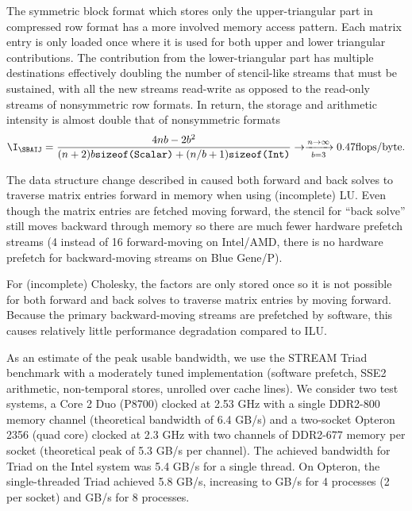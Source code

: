 The symmetric block format {\SBAIJ} which stores only the upper-triangular part in compressed row format has a more involved memory access pattern.
Each matrix entry is only loaded once where it is used for both upper and lower triangular contributions.
The contribution from the lower-triangular part has multiple destinations effectively doubling the number of stencil-like streams that must be sustained, with all the new streams read-write as opposed to the read-only streams of nonsymmetric row formats.
In return, the storage and arithmetic intensity is almost double that of nonsymmetric formats
\begin{align*}
  \I_{\SBAIJ} = \frac{4nb - 2b^2}{(n+2)b\texttt{sizeof(Scalar)} + (n/b+1)\texttt{sizeof(Int)}} \to \xrightarrow[b=3]{n\to\infty} 0.47 \text{flops/byte} .
\end{align*}

The data structure change described in \cite{smith2010sparse} caused both forward and back solves to traverse matrix entries forward in memory when using (incomplete) LU.
Even though the matrix entries are fetched moving forward, the stencil for ``back solve'' still moves backward through memory so there are much fewer hardware prefetch streams (4 instead of 16 forward-moving on Intel/AMD, there is no hardware prefetch for backward-moving streams on Blue Gene/P).

For (incomplete) Cholesky, the factors are only stored once so it is not possible for both forward and back solves to traverse matrix entries by moving forward.
Because the primary backward-moving streams are prefetched by software, this causes relatively little performance degradation compared to ILU.


As an estimate of the peak usable bandwidth, we use the STREAM Triad benchmark with a moderately tuned implementation (software prefetch, SSE2 arithmetic, non-temporal stores, unrolled over cache lines).
We consider two test systems, a Core 2 Duo (P8700) clocked at 2.53 GHz with a single DDR2-800 memory channel (theoretical bandwidth of 6.4 GB/s) and a two-socket Opteron 2356 (quad core) clocked at 2.3 GHz with two channels of DDR2-677 memory per socket (theoretical peak of 5.3 GB/s per channel).
The achieved bandwidth for Triad on the Intel system was 5.4 GB/s for a single thread.
On Opteron, the single-threaded Triad achieved 5.8 GB/s, increasing to  GB/s for 4 processes (2 per socket) and  GB/s for 8 processes.

